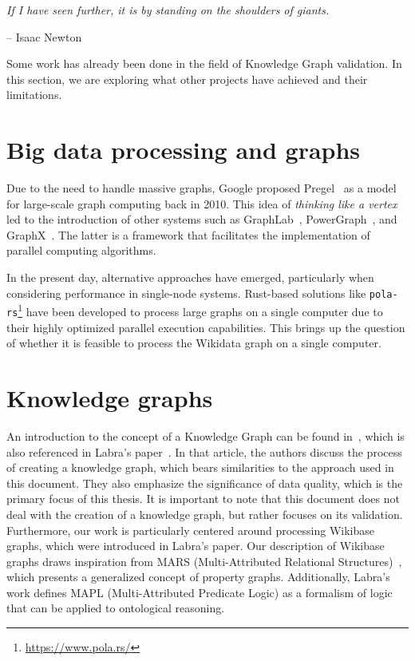 \epigraph{\textit{If I have seen further, it is by standing on the shoulders of giants.}}{-- \textup{Isaac Newton}}

Some work has already been done in the field of Knowledge Graph validation. In this section, we are exploring what other projects have achieved and their limitations.

\section{Big data processing and graphs}

Due to the need to handle massive graphs, Google proposed Pregel~\cite{10.1145/1807167.1807184} as a model for large-scale graph computing back in 2010. This idea of \textit{thinking like a vertex} led to the introduction of other systems such as GraphLab~\cite{10.14778/2212351.2212354}, PowerGraph~\cite{180251}, and GraphX~\cite{186216}. The latter is a framework that facilitates the implementation of parallel computing algorithms.

In the present day, alternative approaches have emerged, particularly when considering performance in single-node systems. Rust-based solutions like \texttt{pola-rs}\footnote{\url{https://www.pola.rs/}} have been developed to process large graphs on a single computer due to their highly optimized parallel execution capabilities. This brings up the question of whether it is feasible to process the Wikidata graph on a single computer.

\section{Knowledge graphs}

An introduction to the concept of a Knowledge Graph can be found in~\cite{10.1145/3447772}, which is also referenced in Labra's paper~\cite{https://doi.org/10.48550/arxiv.2110.11709}. In that article, the authors discuss the process of creating a knowledge graph, which bears similarities to the approach used in this document. They also emphasize the significance of data quality, which is the primary focus of this thesis. It is important to note that this document does not deal with the creation of a knowledge graph, but rather focuses on its validation. Furthermore, our work is particularly centered around processing Wikibase graphs, which were introduced in Labra's paper. Our description of Wikibase graphs draws inspiration from MARS (Multi-Attributed Relational Structures)~\cite{ijcai2017p165}, which presents a generalized concept of property graphs. Additionally, Labra's work defines MAPL (Multi-Attributed Predicate Logic) as a formalism of logic that can be applied to ontological reasoning.

